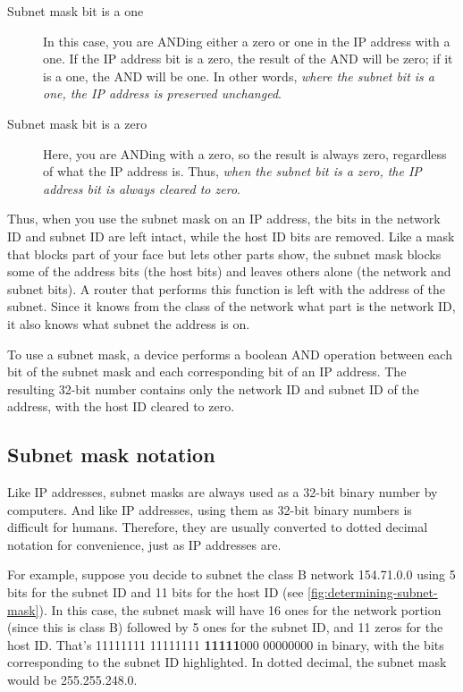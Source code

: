 \begin{description}
   \item[Subnet mask bit is a one]
      In this case, you are ANDing either a zero or one in the IP address with a one.
      If the IP address bit is a zero, the result of the AND will be zero; if it is a one, the AND will be one.
      In other words, \emph{where the subnet bit is a one, the IP address is preserved unchanged}.

   \item[Subnet mask bit is a zero]
      Here, you are ANDing with a zero, so the result is always zero, regardless of what the IP address is.
      Thus, \emph{when the subnet bit is a zero, the IP address bit is always cleared to zero}.
\end{description}

Thus, when you use the subnet mask on an IP address, the bits in the
network ID and subnet ID are left intact, while the host ID bits are
removed. Like a mask that blocks part of your face but lets other parts
show, the subnet mask blocks some of the address bits (the host bits)
and leaves others alone (the network and subnet bits). A router that
performs this function is left with the address of the subnet. Since it
knows from the class of the network what part is the network ID, it also
knows what subnet the address is on.


\begin{keyconcept}
To use a subnet mask, a device performs a boolean AND operation between each bit of the subnet mask and each corresponding bit of an IP address.
The resulting 32-bit number contains only the network ID and subnet ID of the address, with the host ID cleared to zero.
\end{keyconcept}


\subsection{Subnet mask notation}

Like IP addresses, subnet masks are always used as a 32-bit binary number by computers.
And like IP addresses, using them as 32-bit binary numbers is difficult for humans.
Therefore, they are usually converted to dotted decimal notation for convenience, just as IP addresses are.

For example, suppose you decide to subnet the class B network 154.71.0.0 using 5 bits for the subnet ID and 11 bits for the host ID (see \cref{fig:determining-subnet-mask}).
In this case, the subnet mask will have 16 ones for the network portion
(since this is class B) followed by 5 ones for the subnet ID, and 11
zeros for the host ID. That's 11111111 11111111 {\textbf{11111}}000
00000000 in binary, with the bits corresponding to the subnet ID
highlighted. In dotted decimal, the subnet mask would be 255.255.248.0.


